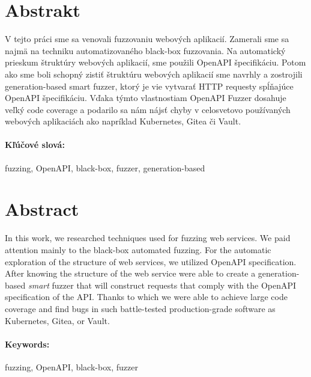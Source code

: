 \documentclass[12pt, twoside]{book}
\begin{document}
\section*{Abstrakt}

V tejto práci sme sa venovali fuzzovaniu webových aplikacií. Zamerali sme sa najmä na techniku automatizovaného black-box fuzzovania. Na automatický prieskum štruktúry webových aplikacií, sme použili OpenAPI špecifikáciu. Potom ako sme boli schopný zistiť štruktúru webových aplikacií sme navrhly a zostrojili generation-based smart fuzzer, ktorý je vie vytvarať HTTP requesty spĺňajúce OpenAPI špecifikáciu. Vďaka týmto vlastnostiam OpenAPI Fuzzer dosahuje veľký code coverage a podarilo sa nám nájsť chyby v celosvetovo používaných webových aplikaciách ako napríklad Kubernetes, Gitea či Vault.


\paragraph*{Kľúčové slová:} fuzzing, OpenAPI, black-box, fuzzer, generation-based


\newpage
\section*{Abstract}
In this work, we researched techniques used for fuzzing web services. We paid attention mainly to the black-box automated fuzzing. For the automatic exploration of the structure of web services, we utilized OpenAPI specification. After knowing the structure of the web service were able to create a generation-based \textit{smart} fuzzer that will construct requests that comply with the OpenAPI specification of the API. Thanks to which we were able to achieve large code coverage and find bugs in such battle-tested production-grade software as Kubernetes, Gitea, or Vault.

\paragraph*{Keywords:} fuzzing, OpenAPI, black-box, fuzzer




\newpage

\tableofcontents

\end{document}
